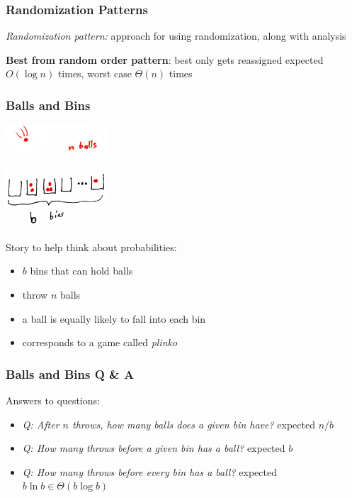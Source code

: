 \documentclass[10pt]{beamer}
\begin{document}

\begin{frame} \frametitle{Randomization Patterns}
\emph{Randomization pattern:} approach for using randomization, along with
analysis
\vspace{1cm}

\textbf{Best from random order pattern}: best only gets reassigned expected $O(\log n)$ times,
worst case $\Theta(n)$ times

\end{frame}

\begin{frame} \frametitle{Balls and Bins}
  \begin{center}
    \includegraphics[height=1.5in]{balls-bins.jpg}
  \end{center}

Story to help think about probabilities:
\begin{itemize}
  \item $b$ bins that can hold balls
  \item throw $n$ balls
  \item a ball is equally likely to fall into each bin
  \item corresponds to a game called \emph{plinko}
\end{itemize}
\end{frame}

\begin{frame} \frametitle{Balls and Bins Q \& A}
Answers to questions:
\begin{itemize}
  \item \emph{Q: After $n$ throws, how many balls does a given bin have?} expected $n/b$
  \item \emph{Q: How many throws before a given bin has a ball?} expected $b$
  \item \emph{Q: How many throws before every bin has a ball?} expected $b \ln b \in \Theta(b \log b)$
\end{itemize}
\end{frame}
\end{document}
